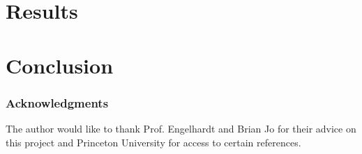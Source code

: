 \documentclass{article} %
\begin{document}

\section{Results}

\section{Conclusion}


\subsubsection*{Acknowledgments}

The author would like to thank Prof. Engelhardt and Brian Jo for their advice on this project and Princeton University for access to certain references. %



\end{document}
